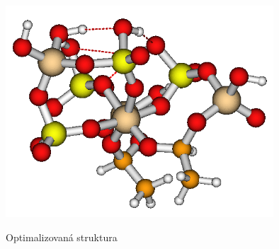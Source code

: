 \documentclass[
  digital, %
  table,   %
  lof,     %
  lot,     %
]{fithesis3}
\begin{document}
\begin{figure}[ht]
\caption{Optimalizovaná struktura  }
  \center
  \includegraphics[width=10cm]{obr_sipo4_4_ax_ekv.png}
  \label{obr_sipo4_4_ax_ekv}
  \end{figure}
\end{document}
